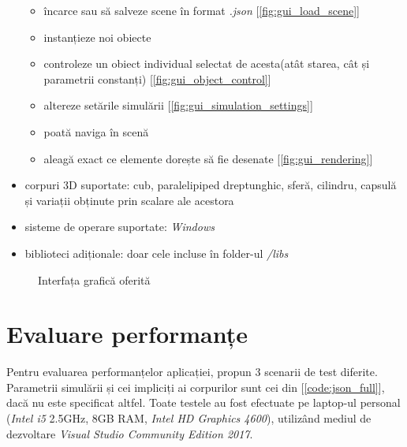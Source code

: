 \documentclass[12pt,a4paper]{report}
\begin{document}
\begin{itemize}
		\begin{itemize} 
			\item încarce sau să salveze scene în format \textit{.json} [\autoref{fig:gui_load_scene}]
			\item instanțieze noi obiecte
			\item controleze un obiect individual selectat de acesta(atât starea, cât și parametrii constanți) [\autoref{fig:gui_object_control}]
			\item altereze setările simulării [\autoref{fig:gui_simulation_settings}]
			\item poată naviga în scenă
			\item aleagă exact ce elemente dorește să fie desenate [\autoref{fig:gui_rendering}]
		\end{itemize}
	\item corpuri 3D suportate: cub, paralelipiped dreptunghic, sferă, cilindru, capsulă și variații obținute prin scalare ale acestora
	\item sisteme de operare suportate: \textit{Windows}
	\item biblioteci adiționale: doar cele incluse în folder-ul \textit{/libs}
\end{itemize}

\begin{figure}[H]
	\centering
	\caption[]{Interfața grafică oferită}
	\label{fig:gui_showcase}
\end{figure}

\section{Evaluare performanțe}
Pentru evaluarea performanțelor aplicației, propun 3 scenarii de test diferite. Parametrii simulării și cei impliciți ai corpurilor sunt cei din [\autoref{code:json_full}], dacă nu este specificat altfel.
Toate testele au fost efectuate pe laptop-ul personal (\textit{Intel i5} 2.5GHz, 8GB RAM, \textit{Intel HD Graphics 4600}), utilizând mediul de dezvoltare \textit{Visual Studio Community Edition 2017}.
\end{document}
